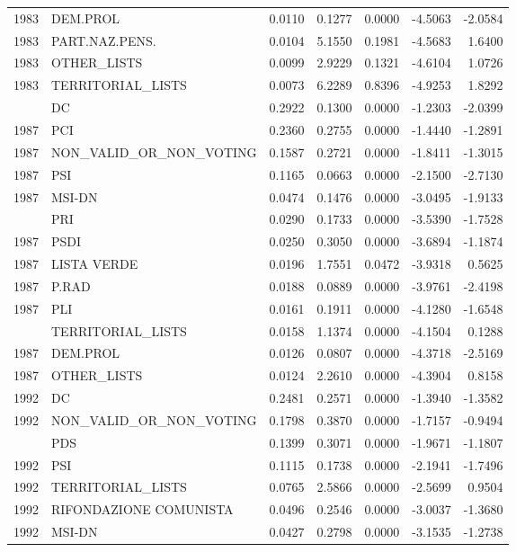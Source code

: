 \begin{longtable}[t]{rlrrrrr}
1983 & DEM.PROL & 0.0110 & 0.1277 & 0.0000 & -4.5063 & -2.0584\\
1983 & PART.NAZ.PENS. & 0.0104 & 5.1550 & 0.1981 & -4.5683 & 1.6400\\
1983 & OTHER\_LISTS & 0.0099 & 2.9229 & 0.1321 & -4.6104 & 1.0726\\
1983 & TERRITORIAL\_LISTS & 0.0073 & 6.2289 & 0.8396 & -4.9253 & 1.8292\\
\addlinespace
1987 & DC & 0.2922 & 0.1300 & 0.0000 & -1.2303 & -2.0399\\
1987 & PCI & 0.2360 & 0.2755 & 0.0000 & -1.4440 & -1.2891\\
1987 & NON\_VALID\_OR\_NON\_VOTING & 0.1587 & 0.2721 & 0.0000 & -1.8411 & -1.3015\\
1987 & PSI & 0.1165 & 0.0663 & 0.0000 & -2.1500 & -2.7130\\
1987 & MSI-DN & 0.0474 & 0.1476 & 0.0000 & -3.0495 & -1.9133\\
\addlinespace
1987 & PRI & 0.0290 & 0.1733 & 0.0000 & -3.5390 & -1.7528\\
1987 & PSDI & 0.0250 & 0.3050 & 0.0000 & -3.6894 & -1.1874\\
1987 & LISTA VERDE & 0.0196 & 1.7551 & 0.0472 & -3.9318 & 0.5625\\
1987 & P.RAD & 0.0188 & 0.0889 & 0.0000 & -3.9761 & -2.4198\\
1987 & PLI & 0.0161 & 0.1911 & 0.0000 & -4.1280 & -1.6548\\
\addlinespace
1987 & TERRITORIAL\_LISTS & 0.0158 & 1.1374 & 0.0000 & -4.1504 & 0.1288\\
1987 & DEM.PROL & 0.0126 & 0.0807 & 0.0000 & -4.3718 & -2.5169\\
1987 & OTHER\_LISTS & 0.0124 & 2.2610 & 0.0000 & -4.3904 & 0.8158\\
1992 & DC & 0.2481 & 0.2571 & 0.0000 & -1.3940 & -1.3582\\
1992 & NON\_VALID\_OR\_NON\_VOTING & 0.1798 & 0.3870 & 0.0000 & -1.7157 & -0.9494\\
\addlinespace
1992 & PDS & 0.1399 & 0.3071 & 0.0000 & -1.9671 & -1.1807\\
1992 & PSI & 0.1115 & 0.1738 & 0.0000 & -2.1941 & -1.7496\\
1992 & TERRITORIAL\_LISTS & 0.0765 & 2.5866 & 0.0000 & -2.5699 & 0.9504\\
1992 & RIFONDAZIONE COMUNISTA & 0.0496 & 0.2546 & 0.0000 & -3.0037 & -1.3680\\
1992 & MSI-DN & 0.0427 & 0.2798 & 0.0000 & -3.1535 & -1.2738\\

\end{longtable}
